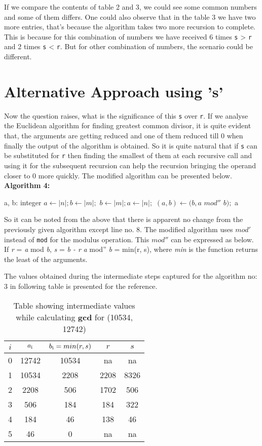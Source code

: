 \documentclass[12pt]{article}
\begin{document}
If we compare the contents of table 2 and 3, we could see some common numbers and some of them differs. One could also observe that in the table 3 we have two more entries, that's because the algorithm takes two more recursion to complete. This is because for 
this combination of numbers we have received 6 times \texttt{s} > \texttt{r} and 2 times 
\texttt{s} < \texttt{r}. But for other combination of numbers, the scenario could be different.

\section{Alternative Approach using 's'}
Now the question raises, what is the significance of this \texttt{s} over \texttt{r}.
If we analyse the Euclidean algorithm for finding greatest common divisor, it is quite evident that, the arguments are getting reduced and one of them reduced till 0 when finally the output of the algorithm is obtained. So it is quite natural that if \texttt{s} can be substituted  for \texttt{r} then finding the smallest of them at each recursive call and using it for the subsequent recursion can help the recursion bringing the operand closer to 0 more quickly. The modified algorithm can be presented below.
\newline \textbf{Algorithm 4:}
\begin{algorithmic}[1]
\STATE a, b: integer
	\STATE $a \gets |n|; b \gets |m|;$
\ELSE
	\STATE $b \gets |m|; a \gets |n|;$
\ENDIF
{} 
	\STATE $(a, b) \leftarrow (b, a  $ $mod'' $ $b);$
\ENDWHILE
\RETURN a
\end {algorithmic}

So it can be noted from the above that there is apparent no change from the previously given algorithm except line no. 8. The modified algorithm uses $mod'$ instead of \texttt{mod} for the modulus operation. This $mod''$ can be expressed as below.
If \textit{r} = \textit{a} mod \textit{b}, \textit{s} = \textit{b - r}
\textit{a} mod'' \textit{b} = min(r, s), where \textit{min} is the function returns the least of the arguments.

The values obtained during the intermediate steps captured for the algorithm no: 3 in following table is presented for the reference.

\begin{table}[h!]
\centering
	\begin{tabular}{c | c | c | c| c}
	\hline
	$i$ & $a\textsubscript{i}$ & $b\textsubscript{i} = min(r,s)$ & $r$ & $s$\\ [0.5ex] 
	\hline
		0 & 12742 & 10534 & na   & na \\ 
		1 & 10534 & 2208  & 2208 & 8326\\  
		2 & 2208  & 506   & 1702 & 506\\
		3 & 506   & 184   & 184  & 322\\
		4 & 184   & 46    & 138  & 46\\
		5 & 46    & 0     & na   & na
	\end{tabular}
\caption{Table showing intermediate values while calculating \textbf{gcd} for (10534, 12742)}
\label{table:4}
\end{table}
\end{document}
